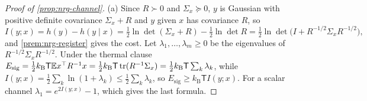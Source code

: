 \begin{proof}[Proof of \cref{prop:nrg-channel}]
(a) Since $R\succ0$ and $\Sigma_x\succeq0$, $y$ is Gaussian with positive definite covariance $\Sigma_x+R$ and $y$ given $x$ has covariance $R$, so
\[
I(y;x)=h(y)-h(y\mid x)=\tfrac12\ln\det(\Sigma_x+R)-\tfrac12\ln\det R=\tfrac12\ln\det\bigl(I+R^{-1/2}\Sigma_xR^{-1/2}\bigr),
\]
and \cref{prem:nrg-register} gives the cost. Let $\lambda_1,\dots,\lambda_m\ge0$ be the eigenvalues of $R^{-1/2}\Sigma_xR^{-1/2}$. Under the thermal clause $E_{\mathrm{sig}}=\tfrac12k_{\mathrm B}\mathsf T\mathbb{E} x^\top R^{-1}x=\tfrac12k_{\mathrm B}\mathsf T\operatorname{tr}(R^{-1}\Sigma_x)=\tfrac12k_{\mathrm B}\mathsf T\sum_k\lambda_k$, while $I(y;x)=\tfrac12\sum_k\ln(1+\lambda_k)\le\tfrac12\sum_k\lambda_k$, so $E_{\mathrm{sig}}\ge k_{\mathrm B}\mathsf TI(y;x)$. For a scalar channel $\lambda_1=e^{2I(y;x)}-1$, which gives the last formula.


\end{proof}
